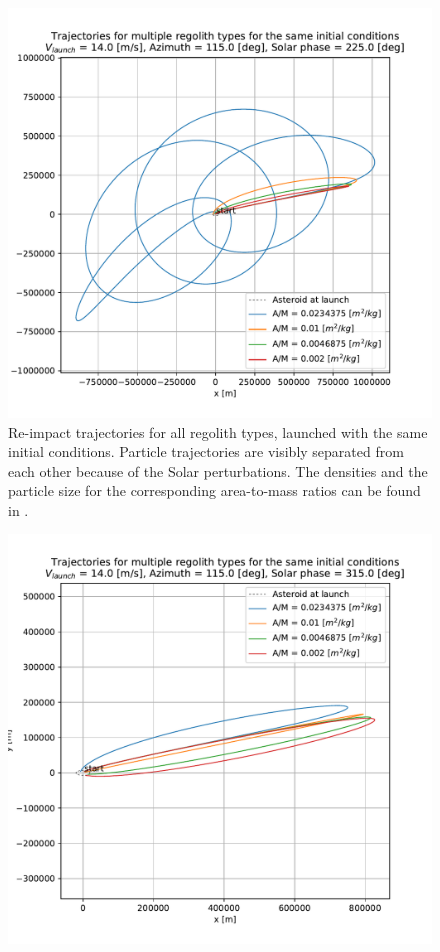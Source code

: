 \documentclass[print]{tudelft-report}
\begin{document}
\begin{appendices}
\begin{figure}[htb]
    \includegraphics[width=\textwidth, height=0.4\textheight, keepaspectratio=true]{Results/Images/leading_edge_perturbations/reimpact_traj_14ms_115Azim_225solarPhase.pdf}
    \caption{Re-impact trajectories for all regolith types, launched with the same initial conditions. Particle trajectories are visibly separated from each other because of the Solar perturbations. The densities and the particle size for the corresponding area-to-mass ratios can be found in .}
    \label{fig:crash_traj_14ms_115Azim_225solarPhase_leadingEdge}
    \end{figure}
    \FloatBarrier
    \begin{figure}[htb]
    \centering
    \captionsetup{justification=centering}
    \includegraphics[width=\textwidth, height=0.4\textheight, keepaspectratio=true]{Results/Images/leading_edge_perturbations/reimpact_traj_14ms_115Azim_315solarPhase.pdf}

\end{figure}
\end{appendices}
\end{document}

